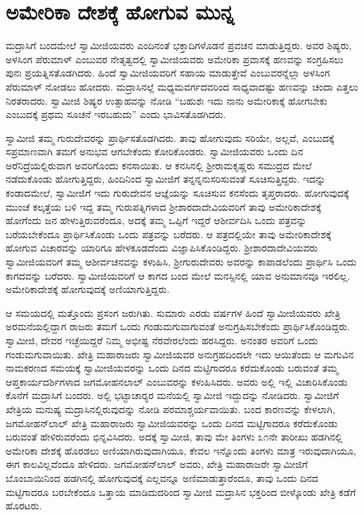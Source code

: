 
\chapter{ಅಮೇರಿಕಾ ದೇಶಕ್ಕೆ ಹೋಗುವ ಮುನ್ನ}

 ಮದ್ರಾಸಿಗೆ ಬಂದಮೇಲೆ ಸ್ವಾಮೀಜಿಯವರು ಎಂದಿನಂತೆ ಭಕ್ತಾದಿಗಳೊಡನೆ ಪ್ರವಚನ ಮಾಡುತ್ತಿದ್ದರು. ಅವರ ಶಿಷ್ಯರು, ಅಳಸಿಂಗ ಪೆರುಮಾಳ್ ಎಂಬುವರ ನೇತೃತ್ವದಲ್ಲಿ ಸ್ವಾಮೀಜಿಯವರು ಅಮೇರಿಕಾ ಪ್ರವಾಸಕ್ಕೆ ಹಣವನ್ನು ಸಂಗ್ರಹಿಸಲು ಪುನಃ ಪ್ರಯತ್ನಿಸತೊಡಗಿದರು. ಹಿಂದೆ ಸ್ವಾಮೀಜಿಯವರಿಗೆ ಸಹಾಯ ಮಾಡುತ್ತೇವೆ ಎಂಬುವರನ್ನೆಲ್ಲಾ ಅಳಸಿಂಗ ಪೆರುಮಾಳ್ ನೋಡಲು ಹೋದರು. ಮದ್ರಾಸಿನಲ್ಲೆ ಮಧ್ಯಮವರ್ಗದವರಿಂದ ಸಾಧ್ಯವಾದಷ್ಟು ಹಣವನ್ನು ಚಂದಾ ಎತ್ತಲು ನಿರತರಾದರು. ಸ್ವಾಮೀಜಿ ಶಿಷ್ಯರ ಉತ್ಸಾಹವನ್ನು ನೋಡಿ “ಬಹುಶಃ ಇದು ನಾನು ಅಮೇರಿಕಾಕ್ಕೆ ಹೋಗಬೇಕು ಎಂಬುದಕ್ಕೆ ಪ್ರಥಮ ಸೂಚನೆ ಇರಬಹುದು” ಎಂದು ಭಾವಿಸತೊಡಗಿದರು. 

 ಸ್ವಾಮೀಜಿ ತಮ್ಮ ಗುರುದೇವರನ್ನು ಪ್ರಾರ್ಥಿಸತೊಡಗಿದರು. ತಾವು ಹೋಗುವುದು ಸರಿಯೇ, ಅಲ್ಲವೆ, ಎಂಬುದಕ್ಕೆ ಸಪ್ರಮಾಣವಾಗಿ ತಮಗೆ ಅನುಭವ ಆಗಬೇಕೆಂದು ಕೋರಿಕೊಂಡರು. ಸ್ವಾಮೀಜಿಯವರು ಒಂದು ದಿನ ಅರೆನಿದ್ರೆಯಲ್ಲಿರುವಾಗ ಅವರಿಗೊಂದು ಕನಸಾಯಿತು. ಆ ಕನಸಿನಲ್ಲಿ ಶ‍್ರೀರಾಮಕೃಷ್ಣರು ಸಮುದ್ರದ ಮೇಲೆ ನಡೆದುಕೊಂಡು ಹೋಗುತ್ತಿದ್ದರು, ಹಿಂದಿನಿಂದ ಸ್ವಾಮೀಜಿಗೆ ತನ್ನನ್ನನುಸರಿಸುವಂತೆ ಸೂಚಿಸುತ್ತಿದ್ದರು. ಇದನ್ನು ಕಂಡಾದಮೇಲೆ, ಸ್ವಾಮೀಜಿಗೆ ಇದು ಗುರುದೇವನ ಆಜ್ಞೆಯನ್ನು ಸೂಚಿಸುವ ಕನಸೆಂದು ತೃಪ್ತರಾದರು. ಹೋಗುವುದಕ್ಕೆ ಮುಂಚೆ ಕಲ್ಕತ್ತೆಯ ಬಳಿ ಇದ್ದ ತಮ್ಮ ಗುರುಪತ್ನಿಗಳಾದ ಶ‍್ರೀಶಾರದಾದೇವಿಯ\-ವರಿಗೆ ತಾವು ಅಮೇರಿಕಾದೇಶಕ್ಕೆ ಹೋಗೆಂದು ಜನ ಹೇಳುತ್ತಿರುವರೆಂದೂ, ಅದಕ್ಕೆ ತಮ್ಮ ಒಪ್ಪಿಗೆ ಇದ್ದರೆ ಆಶೀರ್ವದಿಸಿ ಒಂದು ಪತ್ರವನ್ನು ಬರೆಯಬೇಕೆಂದೂ ಪ್ರಾರ್ಥಿಸಿಕೊಂಡು ಒಂದು ಪತ್ರವನ್ನು ಬರೆದರು. ಆ ಪತ್ರದಲ್ಲಿಯೇ ತಾವು ಅಮೇರಿಕಾದೇಶಕ್ಕೆ ಹೋಗುವ ವಿಚಾರವನ್ನು ಯಾರಿಗೂ ಹೇಳಕೂಡದೆಂದು ವಿಜ್ಞಾಪಿಸಿಕೊಂಡಿದ್ದರು. ಶ‍್ರೀಶಾರದಾದೇವಿಯವರು ಸ್ವಾಮೀಜಿಯವರಿಗೆ ತಮ್ಮ ಆಶೀರ್ವಚನವನ್ನು ಕಳುಹಿಸಿ, ಶ‍್ರೀಗುರುದೇವರು ಅವರನ್ನು ಕಾಪಾಡಲೆಂದು ಪ್ರಾರ್ಥಿಸಿ ಒಂದು ಕಾಗದವನ್ನು ಬರೆದರು. ಸ್ವಾಮೀಜಿಯವರಿಗೆ ಆ ಕಾಗದ ಬಂದ ಮೇಲೆ ಮನಸ್ಸಿನಲ್ಲಿ ಯಾವ ಅನುಮಾನವೂ ಇರಲಿಲ್ಲ. ಅಮೇರಿಕಾದೇಶಕ್ಕೆ ಹೋಗುವುದಕ್ಕೆ ಅಣಿಯಾಗುತ್ತಿದ್ದರು. 

 ಆ ಸಮಯದಲ್ಲಿ ಮತ್ತೊಂದು ಪ್ರಸಂಗ ಜರುಗಿತು. ಸುಮಾರು ಎರಡು ವರ್ಷಗಳ ಹಿಂದೆ ಸ್ವಾಮೀಜಿಯವರು ಖೇತ್ರಿ ಅರಮನೆಯಲ್ಲಿದ್ದಾಗ ರಾಜರು ತಮಗೆ ಒಂದು ಗಂಡುಮಗುವಾಗುವಂತೆ ಅನುಗ್ರಹಿಸಬೇಕೆಂದು ಪ್ರಾರ್ಥಿಸಿಕೊಂಡಿದ್ದರು. ಸ್ವಾಮೀಜಿ, ದೇವರ ಇಚ್ಛೆಯಿದ್ದರೆ ನಿಮ್ಮ ಅಭೀಷ್ಟ ನೆರವೇರಲೆಂದು ಹರಸಿದ್ದರು. ಅನಂತರ ಅವರಿಗೆ ಒಂದು ಗಂಡುಮಗುವಾಯಿತು. ಖೇತ್ರಿ ಮಹಾರಾಜರು ಸ್ವಾಮೀಜಿಯವರ ಅನುಗ್ರಹದಿಂದಲೇ ಇದು ಆಯಿತೆಂದು ಆ ಮಗುವಿನ ನಾಮಕರಣದ ಸಮಯಕ್ಕೆ ಸ್ವಾಮೀಜಿಯವರನ್ನು ಒಂದು ದಿನದ ಮಟ್ಟಿಗಾದರೂ ಕರೆದುಕೊಂಡು ಬರುವಂತೆ ತಮ್ಮ ಆಪ್ತಕಾರ್ಯದರ್ಶಿಗಳಾದ ಜಗಮೋಹನಲಾಲ್ ಎಂಬುವರನ್ನು ಕಳುಹಿಸಿದರು. ಅವರು ಅಲ್ಲಿ ಇಲ್ಲಿ ವಿಚಾರಿಸಿಕೊಂಡು ಕೊನೆಗೆ ಮದ್ರಾಸಿಗೆ ಬಂದರು. ಅಲ್ಲಿ ಭಟ್ಟಾಚಾರ‍್ಯರ ಮನೆಯಲ್ಲಿ ಸ್ವಾಮೀಜಿ ಇದ್ದುದನ್ನು ನೋಡಿದರು. ಸ್ವಾಮೀಜಿಗೆ ಖೇತ್ರಿಯ ಮನುಷ್ಯ ಮದ್ರಾಸಿನಲ್ಲಿರುವುದನ್ನು ನೋಡಿ ಪರಮಾಶ್ಚರ್ಯವಾಯಿತು. ಬಂದ ಕಾರಣವನ್ನು ಕೇಳಲಾಗಿ, ಜಗಮೋಹನ್‍ಲಾಲ್ ಖೇತ್ರಿ ಮಹಾರಾಜರು ಸ್ವಾಮೀಜಿಯವರನ್ನು ಒಂದು ದಿನದ ಮಟ್ಟಿಗಾದರೂ ಕರೆದುಕೊಂಡು ಬರುವಂತೆ ಹೇಳಿರುವರೆಂದು ಭಿನ್ನವಿಸಿದರು. ಅದಕ್ಕೆ ಸ್ವಾಮೀಜಿ, ತಾವು ಮೇ ತಿಂಗಳು ೩೧ನೇ ತಾರೀಖು ಹಡಗಿನಲ್ಲಿ ಅಮೇರಿಕಾ ದೇಶಕ್ಕೆ ಹೊರಡಲು ಅಣಿಯಾಗಿರುವುದಾಗಿಯೂ, ಕೇವಲ ಇನ್ನೊಂದು ತಿಂಗಳು ಮಾತ್ರ ಇರುವುದಾಗಿಯೂ, ಈಗ ಕಾಲವಿಲ್ಲವೆಂದೂ ಹೇಳಿದರು. ಜಗಮೋಹನ್‍ಲಾಲ್ ಅವರು, ಖೇತ್ರಿ ಮಹಾರಾಜರೇ ಸ್ವಾಮೀಜಿಗೆ ಬೊಂಬಾಯಿನಿಂದ ಹಡಗಿನಲ್ಲಿ ಹೋಗುವುದಕ್ಕೆ ಎಲ್ಲವನ್ನೂ ಅಣಿಮಾಡುತ್ತಾರೆಂದೂ, ತಾವು ಒಂದು ದಿನದ ಮಟ್ಟಿಗಾದರೂ ಬರಬೇಕೆಂದೂ ಒತ್ತಾಯ ಮಾಡಿದುದರಿಂದ ಸ್ವಾಮೀಜಿ ಮದ್ರಾಸಿನ ಭಕ್ತರಿಂದ ಬೀಳ್ಕೊಂಡು ಖೇತ್ರಿ ಕಡೆಗೆ ಹೊರಟರು. 

